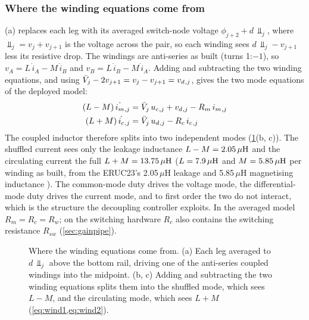 \subsubsection*{Where the winding equations come from}
(a) replaces each leg with its averaged switch-node voltage $\phi_{j+2} + d\,\Vbar_j$, where $\Vbar_j = v_j + v_{j+1}$ is the voltage across the pair, so each winding sees $d\,\Vbar_j - v_{j+1}$ less its resistive drop. The windings are anti-series as built (turns 1:$-1$), so $v_A = L\,\dot i_A - M\,\dot i_B$ and $v_B = L\,\dot i_B - M\,\dot i_A$. Adding and subtracting the two winding equations, and using $\bar{V}_j - 2v_{j+1} = v_j - v_{j+1} = v_{d}{}_{,j}$, gives the two mode equations of the deployed model:
\begin{align}
  (L-M)\,\dot{i_{m}}{}_{,j} &= \bar{V}_j\,u_{c}{}_{,j} + v_{d}{}_{,j} - R_m\,i_{m}{}_{,j} \label{eq:wind1}\\
  (L+M)\,\dot{i_{c}}{}_{,j} &= \bar{V}_j\,u_{d}{}_{,j} - R_c\,i_{c}{}_{,j} \label{eq:wind2}
\end{align}
The coupled inductor therefore splits into two independent modes (\cref{fig:coupled}(b, c)). The shuffled current sees only the leakage inductance $L - M = 2.05\,\mu\mathrm{H}$ and the circulating current the full $L + M = 13.75\,\mu\mathrm{H}$ ($L = 7.9\,\mu\mathrm{H}$ and $M = 5.85\,\mu\mathrm{H}$ per winding as built, from the ERUC23's 2.05\,$\mu$H leakage and 5.85\,$\mu$H magnetising inductance \cite{tdk_eruc23_ds}). The common-mode duty drives the voltage mode, the differential-mode duty drives the current mode, and to first order the two do not interact, which is the structure the decoupling controller exploits. In the averaged model $R_m = R_c = R_w$; on the switching hardware $R_c$ also contains the switching resistance $R_{sw}$ (\cref{sec:gainpipe}).

\begin{figure}[htbp]
  \centering
  
  \caption[{Origin of the winding equations}]{Where the winding equations come from. (a) Each leg averaged to $d\,\Vbar_j$ above the bottom rail, driving one of the anti-series coupled windings into the midpoint. (b, c) Adding and subtracting the two winding equations splits them into the shuffled mode, which sees $L-M$, and the circulating mode, which sees $L+M$ (\cref{eq:wind1,eq:wind2}).}
  \label{fig:coupled}
\end{figure}

